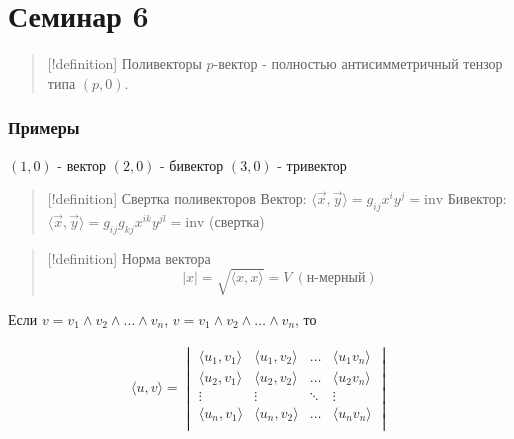 
\section{Семинар 6}

\begin{quote}
{[}!definition{]} Поливекторы \(p\)-вектор - полностью антисимметричный
тензор типа \((p,0)\).
\end{quote}

\subsubsection{Примеры}

\((1,0)\) - вектор \((2, 0)\) - бивектор \((3, 0)\) - тривектор

\begin{quote}
{[}!definition{]} Свертка поливекторов Вектор:
\(\langle \vec{x}, \vec{y} \rangle = g_{ij}x^{i}y^{j} = \mathrm{inv}\)
Бивектор:
\(\langle \vec{x}, \vec{y} \rangle = g_{ij}g_{kj}x^{ik}y^{jl} = \mathrm{inv}\)
(свертка)
\end{quote}

\begin{quote}
{[}!definition{]} Норма вектора
$$|x| = \sqrt{ \langle x,x \rangle } = V \ (\text{н-мерный})$$
\end{quote}

Если \(v = v_{1} \wedge v_{2} \wedge \dots \wedge v_{n}\),
\(v = v_{1} \wedge v_{2} \wedge \dots \wedge v_{n}\), то

$$\begin{gather}
\langle u,v \rangle = \begin{vmatrix}
\langle u_{1},v_{1} \rangle & \langle u_{1},v_{2} \rangle & \dots & \langle u_{1}v_{n} \rangle \\
\langle u_{2},v_{1} \rangle & \langle u_{2},v_{2} \rangle & \dots & \langle u_{2}v_{n} \rangle \\
\vdots & \vdots & \ddots & \vdots \\
\langle u_{n},v_{1} \rangle & \langle u_{n},v_{2} \rangle & \dots & \langle u_{n}v_{n} \rangle \\
\end{vmatrix}
\end{gather}$$

